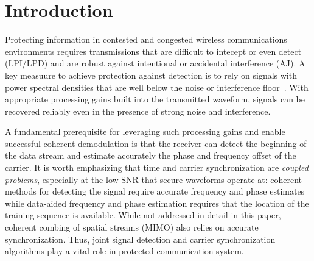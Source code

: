 \section{Introduction}%
\label{sec:introduction}


Protecting information in contested and congested wireless
communications environments requires transmissions that are difficult
to intecept or even detect (LPI/LPD) and are robust against
intentional or accidental interference (AJ).
A key measuure to achieve protection against detection is to rely on
signals with power spectral densities that are well below the noise or
interference floor~\cite{Yan_LPD}.
With appropriate processing gains built into the transmitted waveform, signals can be
recovered reliably even in the presence of strong noise and
interference.

A fundamental prerequisite for leveraging such processing gains and
enable successful coherent demodulation is that the receiver can
detect the beginning of the data stream and estimate accurately the phase and frequency offset of the carrier.
It is worth emphasizing that time and carrier synchronization are
\emph{coupled problems}, especially at the low SNR that secure
waveforms operate at:
coherent methods for detecting the signal require accurate frequency and phase estimates 
while data-aided frequency and phase estimation requires that the
location of the training sequence is available.
While not addressed in detail in this paper, coherent combing of
spatial streams (MIMO) also relies on accurate synchronization.
Thus, joint signal detection and carrier synchronization algorithms
play a vital role in protected communication system.

